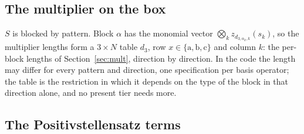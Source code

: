 \documentclass[12pt]{article}
\newcommand{\ba}{\mathrm{a}}
\newcommand{\bb}{\mathrm{b}}
\newcommand{\bc}{\mathrm{c}}
\theoremstyle{plain}
\theoremstyle{definition}
\theoremstyle{remark}
\begin{document}
\subsection{The multiplier on the box}

$S$ is blocked by pattern. Block $\alpha$ has the monomial vector $\bigotimes_kz_{d_{3,\alpha_k,k}}(s_k)$, so the multiplier lengths form a $3\times N$ table $d_3$, row $x\in\{\ba,\bb,\bc\}$ and column $k$: the per-block lengths of Section~\ref{sec:mult}, direction by direction. In the code the length may differ for every pattern and direction, one specification per basis operator; the table is the restriction in which it depends on the type of the block in that direction alone, and no present tier needs more.

\subsection{The Positivstellensatz terms}\label{sec:terms}
\end{document}
